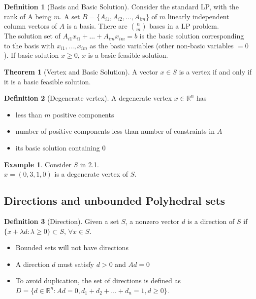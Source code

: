 \documentclass{article}
\theoremstyle{definition}
\newtheorem{theorem}{Theorem}[section]
\newtheorem{definition}{Definition}[section]
\newtheorem{example}{Example}[section]
\begin{document}
	\begin{definition} [Basis and Basic Solution] \hfill \break
		Consider the standard LP, with the rank of A being $m$. A set $B = \{A_{i1}, A_{i2}, \dots, A_{im}\}$ of $m$ linearly independent column vectors of $A$ is a basis. There are $\displaystyle{n \choose m}$ bases in a LP problem.\\The solution set of $A_{i1}x_{i1} + \dots + A_{im}x_{im} = b$ is the basic solution corresponding to the basis with $x_{i1}, \dots, x_{im}$ as the basic variables (other non-basic variables $=0$). If basic solution $x \geq 0$, $x$ is a basic feasible solution.
	\end{definition}

	\begin{theorem}[Vertex and Basic Solution]\hfill\break
		A vector $x \in S$ is a vertex if and only if it is a basic feasible solution.
	\end{theorem}

	\begin{definition}[Degenerate vertex]\hfill\break
		A degenerate vertex $x \in \mathbb{R}^n$ has
		\begin{itemize}
			\item less than $m$ positive components
			\item number of positive components less than number of constraints in $A$
			\item its basic solution containing 0
		\end{itemize}
	\end{definition}

	\begin{example}\hfill\break
		Consider $S$ in 2.1.\\ $x = (0, 3, 1, 0)$ is a degenerate vertex of $S$.
	\end{example}

	\subsection{Directions and unbounded Polyhedral sets}
	\begin{definition}[Direction]\hfill\break
		Given a set $S$, a nonzero vector $d$ is a direction of $S$ if $\{x + \lambda d : \lambda \geq 0\} \subset S$, $\forall x \in S$.
		\begin{itemize}
		    \item Bounded sets will not have directions
		    \item A direction $d$ must satisfy $d > 0$ and $Ad = 0$
		    \item To avoid duplication, the set of directions is defined as $D = \{d \in \mathbb{R}^n: Ad = 0, d_1+d_2+\dots+d_n = 1, d \geq 0\}$.
		\end{itemize}
	\end{definition}
\end{document}
